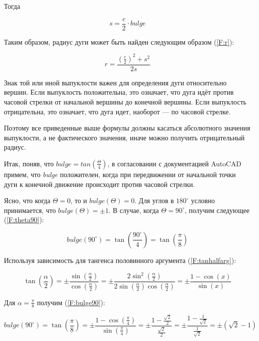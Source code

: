 Тогда

\begin{equation}
	s=\frac{c}{2}\cdot bulge
	\label{F:sfinal}
\end{equation}

Таким образом, радиус дуги может быть найден следующим образом (\ref{F:r}):

\begin{equation}
	r=\frac{(\frac{c}{2})^2+s^2}{2s}
	\label{F:r}
\end{equation}

Знак той или иной выпуклости важен для определения дуги относительно вершин. Если выпуклость положительна, это означает, что дуга идёт против часовой стрелки от начальной вершины до конечной вершины. Если выпуклость отрицательна, это означает, что дуга идет, наоборот --- по часовой стрелке.

Поэтому все приведенные выше формулы должны касаться абсолютного значения выпуклости, а не фактического значения, иначе можно получить отрицательный радиус.

Итак, поняв, что $bulge = tan(\frac{\Theta}{4})$, в согласовании с документацией AutoCAD \cite{Autodesk} примем, что \textit{bulge} положителен, когда при передвижении от начальной точки дуги к конечной движение происходит против часовой стрелки.

Ясно, что когда $\Theta=0$, то и $bulge(\Theta)=0$. Для углов в $180^{\circ}$ условно принимается, что $bulge(\Theta)=\pm1$. В случае, когда $\Theta=90^{\circ}$, получим следующее (\ref{F:theta90}):

\begin{equation}
	bulge(90^{\circ})= \tan(\frac{90^{\circ}}{4})=\tan(\frac{\pi}{8})
	\label{F:theta90}
\end{equation}

Используя зависимость для тангенса половинного аргумента (\ref{F:tanhalfarg}):

\begin{equation}
	\tan(\frac{\alpha}{2})=\pm\frac{\sin(\frac{\alpha}{2})}{\cos(\frac{\alpha}{2})}=\pm\frac{2\sin^2(\frac{\alpha}{2})}{2\sin(\frac{\alpha}{2})\cos(\frac{\alpha}{2})}=\pm\frac{1-\cos(x)}{\sin(x)}
	\label{F:tanhalfarg}
\end{equation}

Для $\alpha=\frac{\pi}{8}$ получим (\ref{F:bulge90}):

\begin{equation}
	bulge(90^{\circ})=\tan(\frac{\pi}{8})=\pm\frac{1-\cos(\frac{\pi}{4})}{\sin(\frac{\pi}{4})}=\pm\frac{1-\frac{\sqrt2}{2}}{\frac{\sqrt2}{2}}=\pm\frac{1-\frac{1}{\sqrt2}}{\frac{1}{\sqrt2}}=\pm(\sqrt2-1)
	\label{F:bulge90}
\end{equation}



